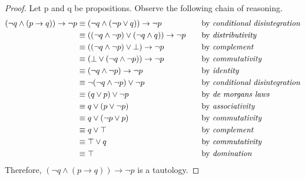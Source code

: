 \documentclass{article}
\begin{document}
\begin {enumerate}
\begin{enumerate}
        \vspace{2ex}
        \begin{proof}
        Let p and q be propositions. Observe the following chain of reasoning.
        \begin{align*}
          (\neg q \land (p \rightarrow q)) \rightarrow \neg p
            &\equiv (\neg q \land (\neg p \lor q)) \rightarrow \neg p
              &\quad
              &\text{by \emph{conditional disintegration}}
              \\
            &\equiv ((\neg q \land \neg p) \lor (\neg q \land  q)) \rightarrow \neg p
              &\quad
              &\text{by \emph{distributivity}}
              \\
            &\equiv ((\neg q \land \neg p) \lor \bot) \rightarrow \neg p
              &\quad
              &\text{by \emph{complement}}
              \\
            &\equiv (\bot \lor (\neg q \land \neg p)) \rightarrow \neg p
              &\quad
              &\text{by \emph{commutativity}}
              \\
            &\equiv (\neg q \land \neg p) \rightarrow \neg p
              &\quad
              &\text{by \emph{identity}}
              \\
            &\equiv \neg(\neg q \land \neg p) \lor \neg p
              &\quad
              &\text{by \emph{conditional disintegration}}
              \\
            &\equiv (q \lor p) \lor \neg p
              &\quad
              &\text{by \emph{de morgans laws}}
              \\
            &\equiv q \lor (p \lor \neg p)
              &\quad
              &\text{by \emph{associativity}}
              \\
            &\equiv q \lor (\neg p \lor p)
              &\quad
              &\text{by \emph{commutativity}}
              \\
            &\equiv q \lor \top
              &\quad
              &\text{by \emph{complement}}
              \\
            &\equiv \top \lor q
              &\quad
              &\text{by \emph{commutativity}}
              \\
            &\equiv \top
              &\quad
              &\text{by \emph{domination}}
              \\
        \end{align*}
        Therefore, $(\neg q \land (p \rightarrow q)) \rightarrow \neg p$ is a tautology.
        \end{proof}
        

\end{enumerate}
\end{enumerate}
\end{document}
